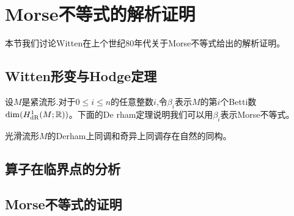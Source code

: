 \ifx\allfiles\undefined

	
	
\else
\fi
\chapter{Morse不等式的解析证明}
本节我们讨论Witten在上个世纪80年代关于Morse不等式给出的解析证明。%
\section{Witten形变与Hodge定理}
设$M$是紧流形.对于$0\leq  i\leq n$的任意整数$i$,令$\beta_i$表示$M$的第$i$个Betti数$\dim (H_{\mathrm{dR}}^1(M;\mathbb{R}))$。下面的De rham定理说明我们可以用$\beta_i$表示Morse不等式。
\begin{theorem}[De rham定理]
	光滑流形$M$的Derham上同调和奇异上同调存在自然的同构。
\end{theorem}
\section{算子在临界点的分析}
\section{Morse不等式的证明}


\ifx\allfiles\undefined
	
	
	
	
	\else
	\fi